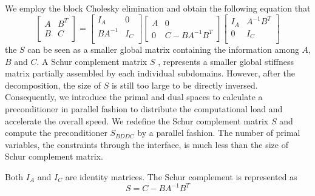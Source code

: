 We employ the block Cholesky elimination and obtain the following equation that
\begin{equation}\label{eq:schur1}
\begin{bmatrix}
A & B^{T} \\ B & C \\
\end{bmatrix} = 
\begin{bmatrix}
I_{A} & 0 \\ BA^{-1} & I_{C}\\
\end{bmatrix} \begin{bmatrix}
A & 0 \\ 0 & C - BA^{-1} B^{T}
\end{bmatrix}
\begin{bmatrix}
I_{A} & A^{-1} B^{T} \\ 0 & I_{C} \\
\end{bmatrix}
\end{equation}
the $ S $ can be seen as a smaller global matrix containing the information among $ A $, $ B $ and $ C $. A Schur complement matrix $ S $ , represents a smaller global stiffness matrix partially assembled by each individual subdomains. However, after the decomposition, the size of $ S $ is still too large to be directly inversed. Consequently, we introduce the primal and dual spaces to calculate a preconditioner in parallel fashion to distribute the computational load and accelerate the overall speed. We redefine the Schur complement matrix $ S $ and compute the preconditioner $ S_{BDDC} $ by a parallel fashion. The number of primal variables, the constraints through the interface, is much less than the size of Schur complement matrix.

Both $ I_{A} $ and $ I_{C} $ are identity matrices. The Schur complement is represented as
\begin{equation}
\mathit{S} = C - BA^{-1} B^{T}
\end{equation}

